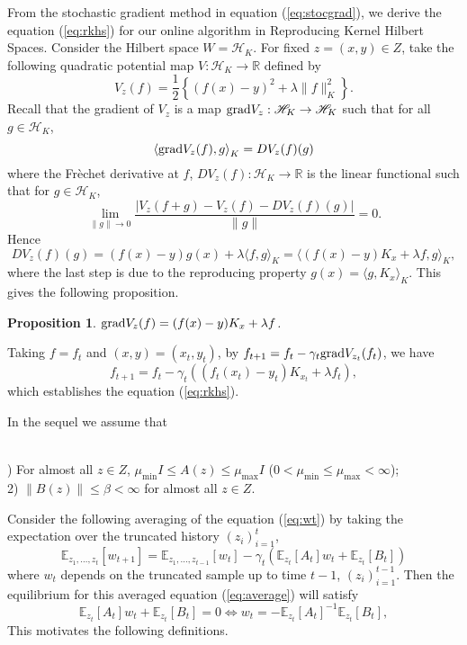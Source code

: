\documentclass[twoside]{amsart}
\theoremstyle{theorem}
\newtheorem{prop}[thm]{Proposition}
\theoremstyle{definition}
\theoremstyle{remark}
\def\H{{\mathscr H}}
\def\grad{{\rm grad}}
\def\amax{{\mu_{\max}}}
\def\amin{{\mu_{\min}} }
\newcommand{\DS}{\displaystyle}
\def\R{{\mathbb R}}        %
\def\E{{\mathbb E}}        %
\def\<{{\langle}}
\def\>{{\rangle}}
\begin{document}
\medskip

From the stochastic gradient method in equation (\ref{eq:stocgrad}), we derive the equation (\ref{eq:rkhs}) for our online
algorithm in Reproducing Kernel Hilbert Spaces. Consider the Hilbert space $W=\H_K$. For fixed $z=(x,y)\in Z$, take the
following quadratic potential map
$V:\H_K\to \R$ defined by
\[ V_z(f) = \frac{1}{2}\left\{ (f(x)-y)^2 + \lambda \|f\|^2_K \right\}. \]
Recall that the gradient of $V_z$ is a map $\grad V_z:\H_K\to \H_K$ such that for all $g\in \H_K$,
\[ \< \grad V_z(f), g\>_K = D V_z(f)(g) \]
where the Fr\`{e}chet derivative at $f$, $D V_z(f):\H_K\to \R$ is the linear functional such that for $g\in \H_K$,
\[ \lim_{\|g\|\to 0} \frac{|V_z(f + g) - V_z(f) - D V_z(f) (g)|}{\|g\|} = 0. \]
Hence
\[ D V_z(f) (g) = (f(x)-y) g(x)  + \lambda \< f , g\>_K = \<(f(x) - y) K_x + \lambda f , g\>_K, \]
where the last step is due to the reproducing property $g(x)=\<g, K_x\>_K$. This gives the following proposition.

\begin{prop}
$\DS \grad V_z(f) = (f(x) - y) K_x + \lambda f$.
\end{prop}

Taking $f=f_t$ and $(x,y)=(x_t,y_t)$, by $f_{t+1}=f_t - \gamma_t \grad V_{z_t}(f_t)$, we have
\[ f_{t+1} = f_t - \gamma_t ((f_t(x_t)-y_t) K_{x_t} + \lambda f_t ),  \]
which establishes the equation (\ref{eq:rkhs}).

\medskip

In the sequel we assume that

\\
) For almost all $z\in Z$, $\amin I\leq  A(z) \leq \amax I$ ($0< \amin\leq \amax < \infty$); \\
2) $\|B(z)\|\leq \beta<\infty$ for almost all $z\in Z$.

Consider the following averaging of the equation (\ref{eq:wt}) by taking the expectation over the truncated history $(z_i)_{i=1}^{t}$,
\begin{equation} \label{eq:average}
\E_{z_1,\ldots,z_{t}}[w_{t+1}] = \E_{z_1,\ldots,z_{t-1}}[w_t] - \gamma_t ( \E_{z_t}[A_t] w_t + \E_{z_t}[B_t])
\end{equation}
where $w_t$ depends on the truncated sample up to time $t-1$, $(z_i)_{i=1}^{t-1}$. Then the equilibrium for this averaged equation (\ref{eq:average})
will satisfy
\begin{equation} \label{eq:wstar}
\E_{z_t} [A_t] w_t + \E_{z_t}[B_t] = 0 \Leftrightarrow w_t=-\E_{z_t}[A_t]^{-1} \E_{z_t}[B_t],
\end{equation}
This motivates the following definitions.
\end{document}
